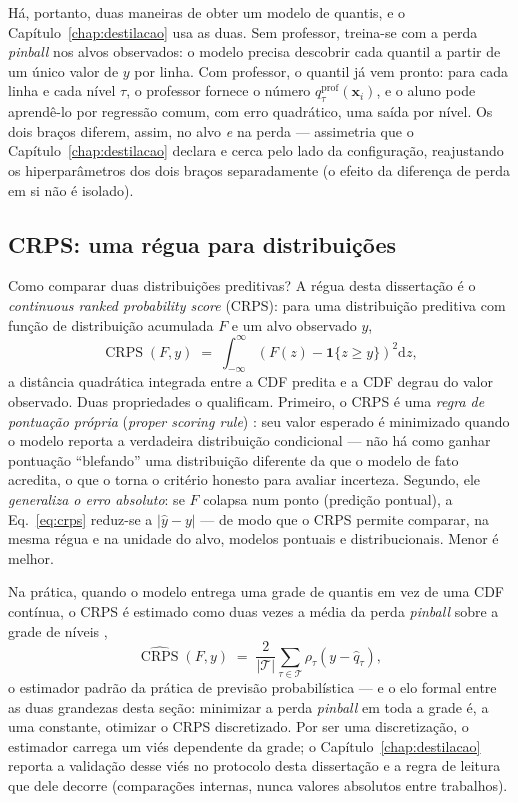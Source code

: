 Há, portanto, duas maneiras de obter um modelo de quantis, e o
Capítulo~\ref{chap:destilacao} usa as duas. Sem professor, treina-se
com a perda \emph{pinball} nos alvos observados: o modelo precisa
descobrir cada quantil a partir de um único valor de $y$ por linha.
Com professor, o quantil já vem pronto: para cada linha e cada nível
$\tau$, o professor fornece o número $q^{\text{prof}}_\tau(\mathbf{x}_i)$,
e o aluno pode aprendê-lo por regressão comum, com erro quadrático,
uma saída por nível. Os dois braços diferem, assim, no alvo \emph{e}
na perda --- assimetria que o Capítulo~\ref{chap:destilacao} declara
e cerca pelo lado da configuração, reajustando os hiperparâmetros dos
dois braços separadamente (o efeito da diferença de perda em si não é
isolado).

\subsection{CRPS: uma régua para distribuições}

Como comparar duas distribuições preditivas? A régua desta dissertação é o
\emph{continuous ranked probability score} (CRPS): para uma distribuição
preditiva com função de distribuição acumulada $F$ e um alvo observado $y$,
\begin{equation}
  \operatorname{CRPS}(F, y) \;=\;
  \int_{-\infty}^{\infty}
  \left( F(z) - \mathbf{1}\{z \geq y\} \right)^2 \mathrm{d}z,
  \label{eq:crps}
\end{equation}
a distância quadrática integrada entre a CDF predita e a CDF degrau do
valor observado. Duas propriedades o qualificam. Primeiro, o CRPS é uma
\emph{regra de pontuação própria} (\emph{proper scoring rule})
\citep{gneiting2007}: seu valor esperado é minimizado quando o modelo
reporta a verdadeira distribuição condicional --- não há como ganhar
pontuação ``blefando'' uma distribuição diferente da que o modelo de fato
acredita, o que o torna o critério honesto para avaliar incerteza.
Segundo, ele \emph{generaliza o erro absoluto}: se $F$ colapsa num ponto
(predição pontual), a Eq.~\ref{eq:crps} reduz-se a $|{\hat{y} - y}|$ --- de
modo que o CRPS permite comparar, na mesma régua e na unidade do alvo,
modelos pontuais e distribucionais. Menor é melhor.

Na prática, quando o modelo entrega uma
grade de quantis em vez de uma CDF contínua, o CRPS é estimado como duas
vezes a média da perda \emph{pinball} sobre a grade de níveis
\citep{gneiting2011},
\begin{equation}
  \widehat{\operatorname{CRPS}}(F, y) \;=\;
  \frac{2}{|\mathcal{T}|} \sum_{\tau \in \mathcal{T}}
  \rho_\tau\!\left(y - \hat{q}_\tau\right),
  \label{eq:crps-grade}
\end{equation}
o estimador padrão da prática de previsão probabilística --- e o elo formal
entre as duas grandezas desta seção: minimizar a perda \emph{pinball} em
toda a grade é, a uma constante, otimizar o CRPS discretizado. Por ser uma
discretização, o estimador carrega um viés dependente da grade; o
Capítulo~\ref{chap:destilacao} reporta a validação desse viés no protocolo desta dissertação e
a regra de leitura que dele decorre (comparações internas, nunca valores
absolutos entre trabalhos).

